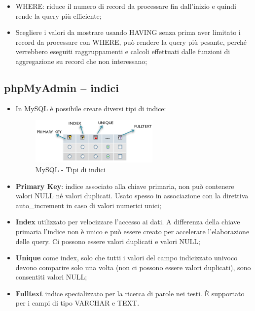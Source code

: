 \begin{itemize}
\begin{itemize}
\item WHERE: riduce il numero di record da processare fin dall’inizio e quindi rende la query più efficiente;
\item Scegliere i valori da mostrare usando HAVING senza prima aver limitato i record da processare con WHERE, può rendere la query più pesante, perché verrebbero eseguiti raggruppamenti e calcoli effettuati dalle funzioni di aggregazione su record che non interessano;

\end{itemize}

\end{itemize}


\subsection{phpMyAdmin – indici}

\begin{itemize}

\item In MySQL è possibile creare diversi tipi di indice:

\begin{center}
\begin{figure}[H]
\centering
\includegraphics[scale=1]{figures/mySQL_index.png}
\caption{MySQL - Tipi di indici} 
\end{figure}
\end{center}

\item{\textbf{Primary Key}}: indice associato alla chiave primaria, non può contenere valori NULL né valori duplicati. Usato spesso in associazione con la direttiva auto\_increment in caso di valori numerici unici;
\item{\textbf{Index}} utilizzato per velocizzare l'accesso ai dati. A differenza della chiave primaria l’indice non è unico e può essere creato per accelerare l'elaborazione delle query. Ci possono essere valori duplicati e valori NULL;
\item{\textbf{Unique}} come index, solo che tutti i valori del campo indicizzato univoco devono comparire solo una volta (non ci possono essere valori duplicati), sono consentiti valori NULL;
\item{\textbf{Fulltext}} indice specializzato per la ricerca di parole nei testi. È supportato per i campi di tipo VARCHAR e TEXT.

\end{itemize}


